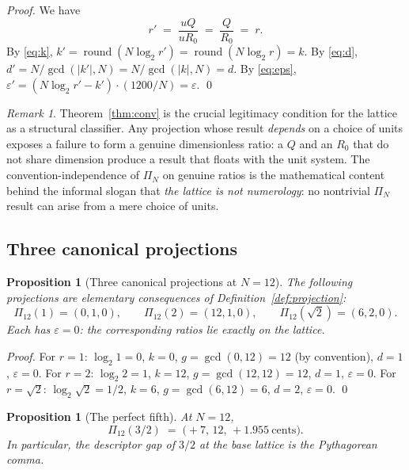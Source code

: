 \documentclass[11pt,a4paper]{article}
\newtheorem{proposition}[theorem]{Proposition}
\theoremstyle{definition}
\theoremstyle{remark}
\newtheorem{remark}[theorem]{Remark}
\DeclareMathOperator{\round}{round}
\newcommand{\eps}{\varepsilon}
\begin{document}
\begin{proof}
We have
\[
r' \;=\; \frac{uQ}{uR_{0}} \;=\; \frac{Q}{R_{0}} \;=\; r.
\]
By \eqref{eq:k}, $k' = \round(N\log_{2}r') = \round(N\log_{2}r) = k$. By \eqref{eq:d}, $d'=N/\gcd(|k'|,N) = N/\gcd(|k|,N) = d$. By \eqref{eq:eps}, $\eps' = (N\log_{2}r'-k')\cdot(1200/N) = \eps$. \qed
\end{proof}

\begin{remark}
Theorem~\ref{thm:conv} is the crucial legitimacy condition for the lattice as a structural classifier. Any projection whose result \emph{depends} on a choice of units exposes a failure to form a genuine dimensionless ratio: a $Q$ and an $R_{0}$ that do not share dimension produce a result that floats with the unit system. The convention-independence of $\Pi_{N}$ on genuine ratios is the mathematical content behind the informal slogan that \emph{the lattice is not numerology}: no nontrivial $\Pi_{N}$ result can arise from a mere choice of units.
\end{remark}

\subsection{Three canonical projections}

\begin{proposition}[Three canonical projections at $N=12$]\label{prop:canonical}
The following projections are elementary consequences of Definition~\ref{def:projection}:
\[
\Pi_{12}(1) = (0,1,0), \qquad \Pi_{12}(2) = (12,1,0), \qquad \Pi_{12}(\sqrt{2}) = (6,2,0).
\]
Each has $\eps=0$: the corresponding ratios lie exactly on the lattice.
\end{proposition}

\begin{proof}
For $r=1$: $\log_{2}1 = 0$, $k=0$, $g=\gcd(0,12)=12$ (by convention), $d=1$, $\eps=0$. For $r=2$: $\log_{2}2 = 1$, $k=12$, $g=\gcd(12,12)=12$, $d=1$, $\eps=0$. For $r=\sqrt{2}$: $\log_{2}\sqrt{2}=1/2$, $k=6$, $g=\gcd(6,12)=6$, $d=2$, $\eps=0$. \qed
\end{proof}

\begin{proposition}[The perfect fifth]\label{prop:fifth}
At $N=12$,
\[
\Pi_{12}(3/2) \;=\; \bigl(+7,\,12,\,+1.955\ \text{cents}\bigr).
\]
In particular, the descriptor gap of $3/2$ at the base lattice is the Pythagorean comma.
\end{proposition}
\end{document}
